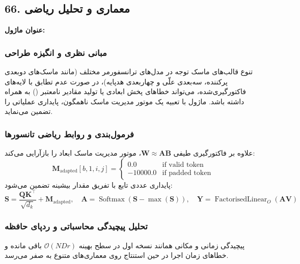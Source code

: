 \subsection*{66. معماری و تحلیل ریاضی }
\textbf{عنوان ماژول:} 

\subsubsection*{مبانی نظری و انگیزه طراحی}
تنوع قالب‌های ماسک توجه در مدل‌های ترانسفورمر مختلف (مانند ماسک‌های دوبعدی پرکننده، سه‌بعدی علّی و چهاربعدی هدپایه)، در صورت عدم تطابق با لایه‌های فاکتورگیری‌شده، می‌تواند خطاهای پخش ابعادی یا تولید مقادیر نامعتبر () به همراه داشته باشد. ماژول  با تعبیه یک موتور مدیریت ماسک ناهمگون، پایداری عملیاتی را تضمین می‌نماید.

\subsubsection*{فرمول‌بندی و روابط ریاضی تانسورها}
علاوه بر فاکتورگیری طیفی $\mathbf{W} \approx \mathbf{A} \mathbf{B}$، موتور مدیریت ماسک ابعاد را بازآرایی می‌کند:
\begin{equation}
\mathbf{M}_{\text{adapted}}[b, 1, i, j] = \begin{cases} 0.0 & \text{if valid token} \\ -10000.0 & \text{if padded token} \end{cases}
\end{equation}
پایداری عددی تابع  با تفریق مقدار بیشینه تضمین می‌شود:
\begin{equation}
\mathbf{S} = \frac{\mathbf{Q} \mathbf{K}^\top}{\sqrt{d_k}} + \mathbf{M}_{\text{adapted}}, \quad \mathbf{A} = \operatorname{Softmax}(\mathbf{S} - \max(\mathbf{S})), \quad \mathbf{Y} = \operatorname{FactorisedLinear}_O(\mathbf{A} \mathbf{V})
\end{equation}

\subsubsection*{تحلیل پیچیدگی محاسباتی و ردپای حافظه}
پیچیدگی زمانی و مکانی همانند نسخه اول در سطح بهینه $\mathcal{O}(N D r)$ باقی مانده و خطاهای زمان اجرا در حین استنتاج روی معماری‌های متنوع به صفر می‌رسد.


